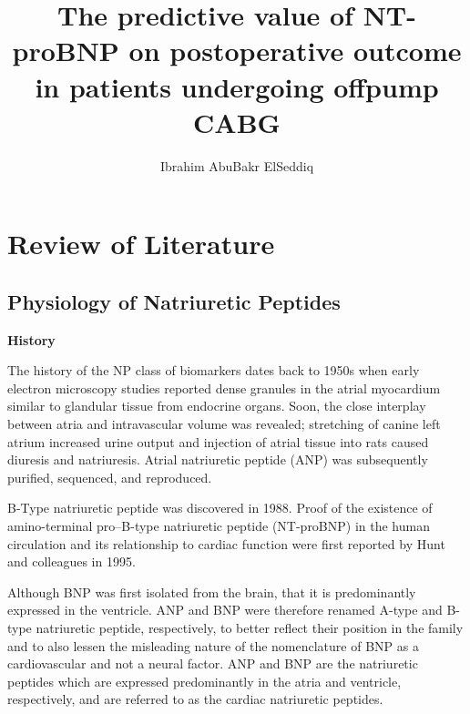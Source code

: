 \documentclass[14pt,a4paper,onecolumn]{extarticle}
\author{Ibrahim AbuBakr ElSeddiq}
\title{The predictive value of NT-proBNP on postoperative outcome in patients undergoing offpump CABG}
\begin{document}
\maketitle

\clearpage
\section{Review of Literature}
\subsection{Physiology of Natriuretic Peptides}

\textbf{History}


The history of the NP class of biomarkers dates back to 1950s when early electron microscopy studies reported dense granules in the atrial myocardium similar to glandular tissue from endocrine organs. Soon, the close interplay between atria and intravascular volume was revealed; stretching of canine left atrium increased urine output and injection of atrial tissue into rats caused diuresis and natriuresis. Atrial natriuretic peptide (ANP) was subsequently purified, sequenced, and reproduced. \citep{Gaggin2014} %

B-Type natriuretic peptide was discovered in 1988. Proof of the existence of amino-terminal pro–B-type natriuretic peptide (NT-proBNP) in the human circulation and its relationship to cardiac function were first reported by Hunt and colleagues in 1995. \citep{Richards2018} %

Although BNP was first isolated from the brain, that it is predominantly expressed in the ventricle. ANP and BNP were therefore renamed A-type and B-type natriuretic peptide, respectively, to better reflect their position in the family and to also lessen the misleading nature of the nomenclature of BNP as a cardiovascular and not a neural factor. ANP and BNP are the natriuretic peptides which are expressed predominantly in the atria and ventricle, respectively, and are referred to as the cardiac natriuretic peptides. \citep{Suzuki2001}
\end{document}
